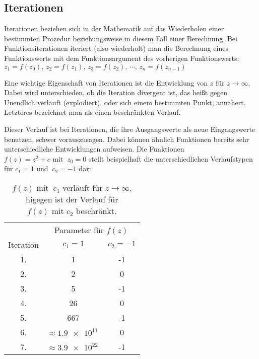 \subsection{Iterationen}\label{subsec:iterations}

Iterationen beziehen sich in der Mathematik auf das Wiederholen einer bestimmten
Prozedur beziehungsweise in diesem Fall einer Berechnung.
Bei Funktionsiterationen iteriert (also wiederholt) man die Berechnung eines
Funktionswerts mit dem Funktionsargument des vorherigen Funktionswerts:
\(z_1 = f(z_0),\, z_2 = f(z_1),\, z_3 = f(z_2),\, \cdots,\, z_n = f(z_{n-1})\)

Eine wichtige Eigenschaft von
Iterationen ist die Entwicklung von \(z \text{ für } z \to \infty\).
Dabei wird unterschieden, ob die Iteration divergent ist,
das heißt gegen Unendlich verl\"auft (\glqq explodiert\grqq),
oder sich einem bestimmten Punkt, ann\"ahert.
Letzteres bezeichnet man als einen beschränkten Verlauf.

Dieser Verlauf ist bei Iterationen, die ihre Ausgangswerte als neue Eingangswerte
benutzen, schwer vorauszusagen.
Dabei k\"onnen \"ahnlich Funktionen bereits sehr unterschiedliche Entwicklungen aufweisen.
Die Funktionen \(f(z) = z^2 + c \text{ mit }\ z_0 = 0\) stellt beispielhaft
die unterschiedlichen Verlaufstypen für \(c_1 = 1 \text{ und }\ c_2 = -1\) dar:

\begin{table}[h!]\label{tab:iterations-example}
  \centering
  \begin{tabular}{@{}ccc@{}}
    \toprule
    & \multicolumn{2}{c}{Parameter für \(f(z)\)} \\
    \cmidrule(lr){2-3}
    Iteration & \( c_1 = 1\) & \( c_2 = -1\) \\
    \midrule
    1. & 1 & -1 \\
    2. & 2 & 0 \\
    3. & 5 & -1 \\
    4. & 26 & 0 \\
    5. & 667 & -1 \\
    6. & \(\approx \num{1,9e11}\ \) & 0 \\
    7. & \(\approx \num{3,9e22}\ \) & -1 \\
    \bottomrule
  \end{tabular}
  \caption{
    \(f(z) \text{ mit }\ c_1\) verl\"auft f\"ur \(z \to \infty\),
    higegen ist der Verlauf f\"ur \(f(z) \text{ mit } c_2\) beschr\"ankt.
  }
\end{table}